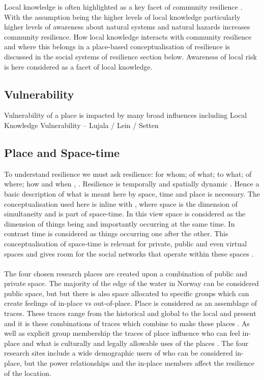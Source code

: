 Local knowledge is often highlighted as a key facet of community resilience \cite{setten_we_2019}. With the assumption being the higher levels of local knowledge particularly higher levels of awareness about natural systems and natural hazards increases community resilience.  How local knowledge interacts with community resilience and where this belongs in a place-based conceptualisation of resilience is discussed in the social systems of resilience section below. Awareness of local risk is here considered as a facet of local knowledge.  

 
 
\subsection{Vulnerability}
Vulnerability of a place is impacted by many broad influences including Local Knowledge 
Vulnerability – Lujala / Lein / Setten 



\subsection{Place and Space-time} 
To understand resilience we must ask resilience: for whom; of what; to what; of where; how and when \cite{cutter_community_2020}, \cite{moser_turbulent_2019}. Resilience is temporally and spatially dynamic \cite{cutter_community_2020}. Hence a basic description of what is meant here by space, time and place is necessary. The conceptualisation used here is inline with \cite{massey_for_2005}, where space is the dimension of simultaneity and is part of space-time. In this view space is considered as the dimension of things being and importantly occurring at the same time. In contrast time is considered as things occurring one after the other. This conceptualisation of space-time is relevant for private, public and even virtual spaces and gives room for the social networks that operate within these spaces \cite{massey_for_2005} \cite{allen_rethinking_1998}.

\paragraph{}
The four chosen research places are created upon a combination of public and private space. The majority of the edge of the water in Norway can be considered public space, but but there is also space allocated to specific groups which can create feelings of in-place vs out-of-place. Place is considered as an assemblage of traces. These traces range from the historical and global to the local and present and it is these combinations of traces which combine to make these places \cite{anderson_understanding_2015} \cite{massey_for_2005}. As well as explicit group membership the traces of place influence who can feel in-place and what is culturally and legally allowable uses of the places \cite{anderson_understanding_2015}. The four research sites include a wide demographic users of who can be considered in-place, but the power relationships and the in-place members affect the resilience of the location. 

